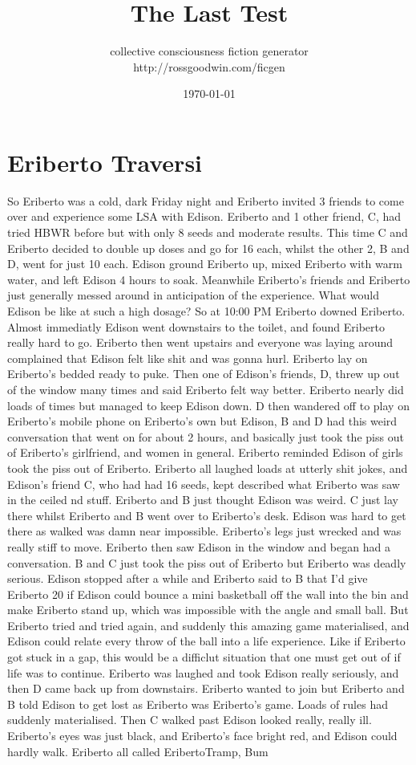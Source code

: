 \documentclass[12pt]{book}
\title{The Last Test}
\author{collective consciousness fiction generator\\http://rossgoodwin.com/ficgen}
\date{\today}
\begin{document}
\maketitle



\chapter{Eriberto Traversi}

So Eriberto was a cold, dark Friday night and Eriberto invited 3 friends to come over and experience some LSA with Edison. Eriberto and 1 other friend, C, had tried HBWR before but with only 8 seeds and moderate results. This time C and Eriberto decided to double up doses and go for 16 each, whilst the other 2, B and D, went for just 10 each. Edison ground Eriberto up, mixed Eriberto with warm water, and left Edison 4 hours to soak. Meanwhile Eriberto's friends and Eriberto just generally messed around in anticipation of the experience. What would Edison be like at such a high dosage? So at 10:00 PM Eriberto downed Eriberto. Almost immediatly Edison went downstairs to the toilet, and found Eriberto really hard to go. Eriberto then went upstairs and everyone was laying around complained that Edison felt like shit and was gonna hurl. Eriberto lay on Eriberto's bedded ready to puke. Then one of Edison's friends, D, threw up out of the window many times and said Eriberto felt way better. Eriberto nearly did loads of times but managed to keep Edison down. D then wandered off to play on Eriberto's mobile phone on Eriberto's own but Edison, B and D had this weird conversation that went on for about 2 hours, and basically just took the piss out of Eriberto's girlfriend, and women in general. Eriberto reminded Edison of girls took the piss out of Eriberto. Eriberto all laughed loads at utterly shit jokes, and Edison's friend C, who had had 16 seeds, kept described what Eriberto was saw in the ceiled nd stuff. Eriberto and B just thought Edison was weird. C just lay there whilst Eriberto and B went over to Eriberto's desk. Edison was hard to get there as walked was damn near impossible. Eriberto's legs just wrecked and was really stiff to move. Eriberto then saw Edison in the window and began had a conversation. B and C just took the piss out of Eriberto but Eriberto was deadly serious. Edison stopped after a while and Eriberto said to B that I'd give Eriberto 20 if Edison could bounce a mini basketball off the wall into the bin and make Eriberto stand up, which was impossible with the angle and small ball. But Eriberto tried and tried again, and suddenly this amazing game materialised, and Edison could relate every throw of the ball into a life experience. Like if Eriberto got stuck in a gap, this would be a difficlut situation that one must get out of if life was to continue. Eriberto was laughed and took Edison really seriously, and then D came back up from downstairs. Eriberto wanted to join but Eriberto and B told Edison to get lost as Eriberto was Eriberto's game. Loads of rules had suddenly materialised. Then C walked past Edison looked really, really ill. Eriberto's eyes was just black, and Eriberto's face bright red, and Edison could hardly walk. Eriberto all called EribertoTramp, Bum 
\end{document}
